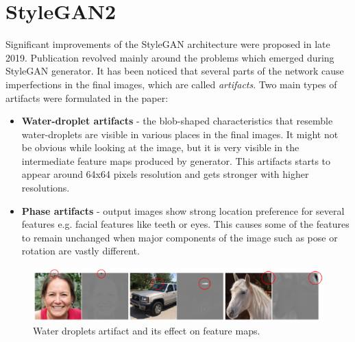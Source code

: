 \documentclass[12pt,a4paper,openany]{book}
\begin{document}


\section{StyleGAN2}

Significant improvements of the StyleGAN architecture were proposed in late 2019. Publication revolved mainly around the problems which emerged during StyleGAN generator. It has been noticed that several parts of the network cause imperfections in the final images, which are called \textit{artifacts}. Two main types of artifacts were formulated in the paper:

\begin{itemize}
\item \textbf{Water-droplet artifacts} - the blob-shaped characteristics that resemble water-droplets are visible in various places in the final images. It might not be obvious while looking at the image, but it is very visible in the intermediate feature maps produced by generator. This artifacts starts to appear around 64x64 pixels resolution and gets stronger with higher resolutions. 
\item \textbf{Phase artifacts} - output images show strong location preference for several features e.g. facial features like teeth or eyes. This causes some of the features to remain unchanged when major components of the image such as pose or rotation are vastly different.
\end{itemize}


\begin{figure}[ht!]
    \centering
    \includegraphics[scale=1.0]{figs/water-droplets.eps}
    \caption{Water droplets artifact and its effect on feature maps.}\label{Fig:STYLEGAN}
\end{figure}
\end{document}
